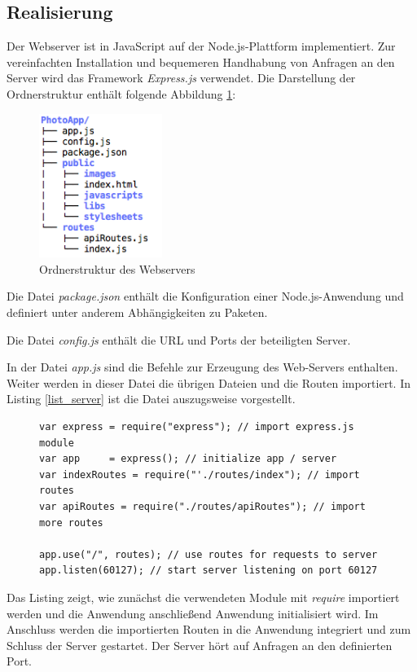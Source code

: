 \subsection{Realisierung}
Der Webserver ist in JavaScript auf der Node.js-Plattform implementiert. Zur vereinfachten Installation und bequemeren Handhabung von Anfragen an den Server wird das Framework \textit{Express.js} verwendet. 
\clearpage
Die Darstellung der Ordnerstruktur enthält folgende Abbildung \ref{fig_struktur_webserver}:
\begin{figure}[h]
	\centering
	\includegraphics[width=4cm]{bilder/ordnerstruktur_photoapp}
	\caption{Ordnerstruktur des Webservers}
	\label{fig_struktur_webserver}
\end{figure}

Die Datei \textit{package.json} enthält die Konfiguration einer Node.js-Anwendung und 
definiert unter anderem Abhängigkeiten zu Paketen.

Die Datei \textit{config.js} enthält die URL und Ports der beteiligten Server.

In der Datei \textit{app.js} sind die Befehle zur Erzeugung des Web-Servers enthalten. Weiter werden in dieser Datei die übrigen Dateien und die Routen importiert. In Listing \ref{list_server} ist die Datei auszugsweise vorgestellt.

\begin{figure}[h]
\begin{lstlisting}[caption={Auszug aus app.js (Webserver)}, label=list_server]
var express	= require("express"); // import express.js module
var app		= express(); // initialize app / server
var indexRoutes = require("'./routes/index"); // import routes
var apiRoutes = require("./routes/apiRoutes"); // import more routes

app.use("/", routes); // use routes for requests to server
app.listen(60127); // start server listening on port 60127
\end{lstlisting}
\end{figure}

Das Listing zeigt, wie zunächst die verwendeten Module mit \textit{require} importiert werden und die Anwendung anschließend Anwendung initialisiert wird. Im Anschluss werden die importierten Routen in die Anwendung integriert und zum Schluss der Server gestartet. Der Server hört auf Anfragen an den definierten Port.

